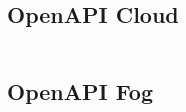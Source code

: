 \subsection{OpenAPI Cloud}\label{app:openapi:cloud}
\inputminted[fontsize=\footnotesize,frame=lines,linenos]{yaml}{../cloud-backend/src/main/resources/openapi.yaml}

\subsection{OpenAPI Fog}\label{app:openapi:fog}
\inputminted[fontsize=\footnotesize,frame=lines,linenos]{yaml}{../rpi-backend/src/main/resources/openapi.yaml}
